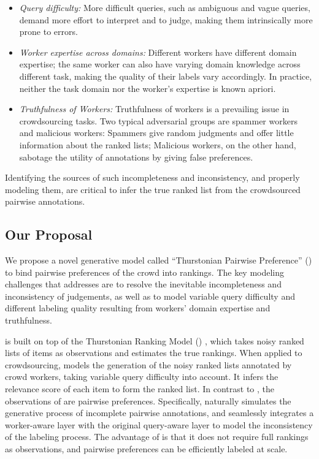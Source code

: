\begin{itemize}
  \item \emph{Query difficulty:}  More difficult queries, such as ambiguous and
    vague queries, demand more effort to interpret and to judge, making them
    intrinsically more prone to errors.
  \item  {\emph{Worker expertise across domains:}} Different workers have
    different domain expertise; the same worker can also have varying domain
    knowledge across different task, making the quality of their labels vary
    accordingly. In practice, neither the task domain nor the worker's expertise
    is known apriori.
  \item {\emph{Truthfulness of Workers:}} Truthfulness of workers is a
    prevailing issue in crowdsourcing tasks. Two typical adversarial groups are
    spammer workers and malicious workers: Spammers give random judgments and
    offer little information about the ranked lists;  Malicious workers, on the
    other hand, sabotage the utility of annotations by giving false preferences.
\end{itemize}

Identifying the sources of such incompleteness and inconsistency, and properly
modeling them, are critical to infer the true ranked list from the crowdsourced
pairwise annotations.

\subsection{Our Proposal}

We propose a novel generative model called ``Thurstonian Pairwise Preference''
(\tpp{}) to bind pairwise preferences of the crowd into rankings.  The key
modeling challenges that \tpp{} addresses are to resolve the inevitable
incompleteness and inconsistency of judgements, as well as to model variable
query difficulty and different labeling quality resulting from workers' domain
expertise and truthfulness.

\tpp{} is built on top of the Thurstonian Ranking Model (\trm{})
\cite{thurstone1927law}, which takes noisy ranked lists of items as observations
and estimates the true rankings. When applied to crowdsourcing, \trm{} models
the generation of the noisy ranked lists annotated by crowd workers, taking
variable query difficulty into account. It infers the relevance score of each
item to form the ranked list. In contrast to \trm{}, the observations of \tpp{}
are pairwise preferences.  Specifically, \tpp{} naturally simulates the
generative process of incomplete pairwise annotations, and seamlessly integrates
a worker-aware layer with the original query-aware layer to model the
inconsistency of the labeling process.  The advantage of \tpp{} is that it does
not require full rankings as observations, and pairwise preferences can be
efficiently labeled at scale.

